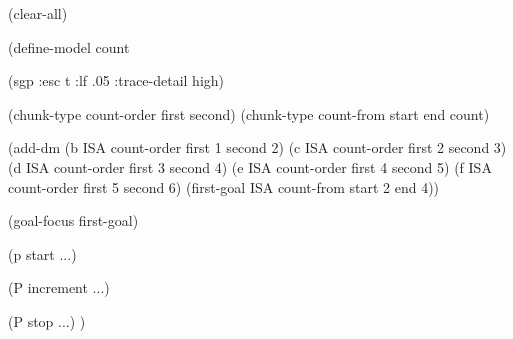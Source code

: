 (clear-all)

(define-model count

(sgp :esc t :lf .05 :trace-detail high)

(chunk-type count-order first second)
(chunk-type count-from start end count)

(add-dm
 (b ISA count-order first 1 second 2)
 (c ISA count-order first 2 second 3)
 (d ISA count-order first 3 second 4)
 (e ISA count-order first 4 second 5)
 (f ISA count-order first 5 second 6)
 (first-goal ISA count-from start 2 end 4))

(goal-focus first-goal)

(p start
...)

(P increment
...)

(P stop
...)
)
